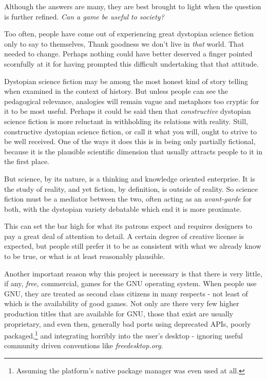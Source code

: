 

Although the answers are many, they are best brought to light when the question is further refined. {\it Can a game be useful to society?}

Too often, people have come out of experiencing great dystopian science fiction only to say to themselves, Thank goodness we don't live in {\it that} world. That needed to change. Perhaps nothing could have better deserved a finger pointed scornfully at it for having prompted this difficult undertaking that that attitude.

Dystopian science fiction may be among the most honest kind of story telling when examined in the context of history. But unless people can see the pedagogical relevance, analogies will remain vague and metaphors too cryptic for it to be most useful. Perhaps it could be said then that {\it constructive} dystopian science fiction is more reluctant in withholding its relations with reality.
    {}
Still, constructive dystopian science fiction, or call it what you will, ought to strive to be well received. One of the ways it does this is in being only partially fictional, because it is the plausible scientific dimension that usually attracts people to it in the first place.

But science, by its nature, is a thinking and knowledge oriented enterprise. It is the study of reality, and yet fiction, by definition, is outside of reality. So science fiction must be a mediator between the two, often acting as an {\it avant-garde} for both, with the dystopian variety debatable which end it is more proximate.

This can set the bar high for what its patrons expect and requires designers to pay a great deal of attention to detail. A certain degree of creative license is expected, but people still prefer it to be as consistent with what we already know to be true, or what is at least reasonably plausible.

Another important reason why this project is necessary is that there is very little, if any, {\it free}, commercial, games for the GNU operating system. When people use GNU, they are treated as second class citizens in many respects - not least of which is the availability of good games. Not only are there very few higher production titles that are available for GNU, those that exist are usually proprietary, and even then, generally bad ports using deprecated APIs, poorly packaged,\footnote{Assuming the platform's native package manager was even used at all.} and integrating horribly into the user's desktop - ignoring  useful community driven conventions like {\it freedesktop.org}. 

